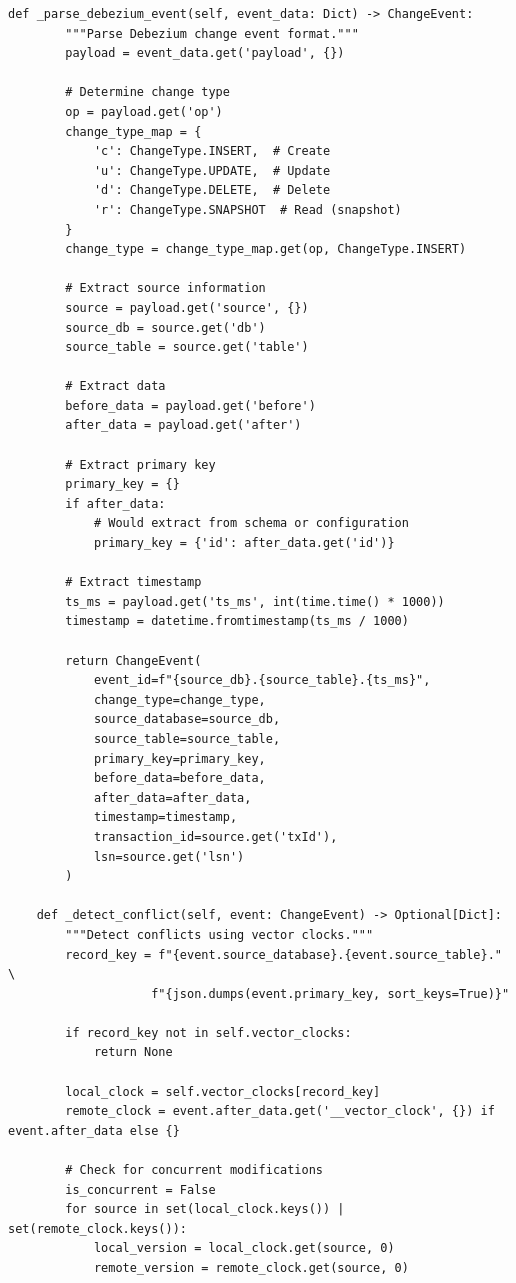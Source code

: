 \begin{lstlisting}[style=python, caption=CDCProcessor with Change Stream Handling]
    def _parse_debezium_event(self, event_data: Dict) -> ChangeEvent:
        """Parse Debezium change event format."""
        payload = event_data.get('payload', {})

        # Determine change type
        op = payload.get('op')
        change_type_map = {
            'c': ChangeType.INSERT,  # Create
            'u': ChangeType.UPDATE,  # Update
            'd': ChangeType.DELETE,  # Delete
            'r': ChangeType.SNAPSHOT  # Read (snapshot)
        }
        change_type = change_type_map.get(op, ChangeType.INSERT)

        # Extract source information
        source = payload.get('source', {})
        source_db = source.get('db')
        source_table = source.get('table')

        # Extract data
        before_data = payload.get('before')
        after_data = payload.get('after')

        # Extract primary key
        primary_key = {}
        if after_data:
            # Would extract from schema or configuration
            primary_key = {'id': after_data.get('id')}

        # Extract timestamp
        ts_ms = payload.get('ts_ms', int(time.time() * 1000))
        timestamp = datetime.fromtimestamp(ts_ms / 1000)

        return ChangeEvent(
            event_id=f"{source_db}.{source_table}.{ts_ms}",
            change_type=change_type,
            source_database=source_db,
            source_table=source_table,
            primary_key=primary_key,
            before_data=before_data,
            after_data=after_data,
            timestamp=timestamp,
            transaction_id=source.get('txId'),
            lsn=source.get('lsn')
        )

    def _detect_conflict(self, event: ChangeEvent) -> Optional[Dict]:
        """Detect conflicts using vector clocks."""
        record_key = f"{event.source_database}.{event.source_table}." \
                    f"{json.dumps(event.primary_key, sort_keys=True)}"

        if record_key not in self.vector_clocks:
            return None

        local_clock = self.vector_clocks[record_key]
        remote_clock = event.after_data.get('__vector_clock', {}) if event.after_data else {}

        # Check for concurrent modifications
        is_concurrent = False
        for source in set(local_clock.keys()) | set(remote_clock.keys()):
            local_version = local_clock.get(source, 0)
            remote_version = remote_clock.get(source, 0)


\end{lstlisting}
